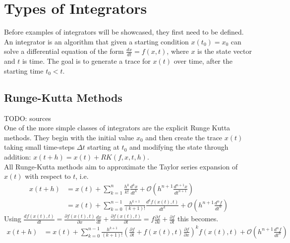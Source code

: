 \section{Types of Integrators}
Before examples of integrators will be showcased, they first need to be defined.
An integrator is an algorithm that given a starting condition $x(t_0) = x_0$ can solve a differential equation of the form $\frac{dx}{dt} = f(x,t)$, where $x$ is the state vector and $t$ is time.
The goal is to generate a trace for $x(t)$ over time, after the starting time $t_0<t$.

\subsection{Runge-Kutta Methods}
TODO: sources\\
One of the more simple classes of integrators are the explicit Runge Kutta methods.
They begin with the initial value $x_0$ and then create the trace $x(t)$ taking small time-steps $\Delta t$ starting at $t_0$ and modifying the state through addition: $x(t+h) = x(t) + RK(f,x,t,h)$.\\
All Runge-Kutta methods aim to approximate the Taylor series expansion of $x(t)$ with respect to $t$, i.e.
\begin{align*}
x(t+h) &= x(t) + \sum_{k=1}^{n}\frac{h^k}{k!}\frac{d^kx}{dt^k} + \mathcal{O} \left(h^{n+1}\frac{d^{n+1}x}{dt^{n+1}}\right)\\
&= x(t)+ \sum_{k=0}^{n-1}\frac{h^{k+1}}{(k+1)!}\frac{d^kf(x(t),t)}{dt^k} + \mathcal{O}\left(h^{n+1}\frac{d^{n}f}{dt^{n}}\right)
\end{align*}
Using $\frac{df(x(t),t)}{dt} 
= \frac{\partial f(x(t),t)}{\partial x}\frac{dx}{dt}+\frac{\partial f(x(t),t)}{\partial t} 
= f\frac{\partial f}{\partial x}+\frac{\partial f}{\partial t}$
this becomes.
\begin{align*}
x(t+h) &= x(t)+ \sum_{k=0}^{n-1}\frac{h^{k+1}}{(k+1)!}\left(\frac{\partial f}{\partial t} + f(x(t),t)\frac{\partial f}{\partial x}\right)^kf(x(t),t) + \mathcal{O}\left(h^{n+1}\frac{d^{n}f}{dt^{n}}\right)
\end{align*}


